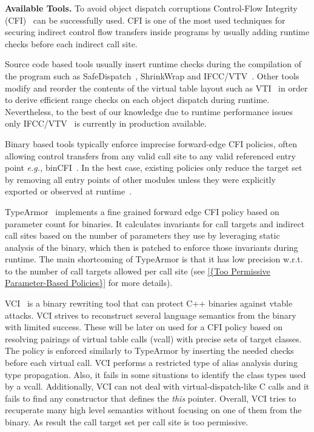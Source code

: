 \textbf{Available Tools.}
To avoid object dispatch corruptions Control-Flow Integrity (CFI)~\cite{abadi:cfi2, abadi:cfi} can be successfully used.
CFI is one of the most used techniques for securing indirect control flow transfers inside programs
by usually adding runtime checks before each indirect call site.

Source code based tools usually insert runtime checks during the compilation of 
the program such as SafeDispatch~\cite{safedispatch:jang}, ShrinkWrap \cite{haller:shrinkwrap} and IFCC/VTV~\cite{vtv:tice}.
Other tools modify and reorder the contents of the virtual table layout such as VTI~\cite{bounov:interleaving} 
in order to derive efficient range checks on each object dispatch during runtime. Nevertheless, to the best of our knowledge 
due to runtime performance issues only IFCC/VTV~\cite{vtv:tice} is currently in production available.

Binary based tools typically enforce imprecise forward-edge CFI 
policies, often allowing control transfers from any valid call site 
to any valid referenced entry point \textit{e.g.,} binCFI~\cite{ccfir:zhang, zhang:usenix}. 
In the best case, existing policies only reduce the target set by
removing all entry points of other modules unless they were
explicitly exported or observed at runtime~\cite{payer:dimva}. 

TypeArmor~\cite{veen:typearmor} implements a fine grained forward edge CFI 
policy based on parameter count for binaries. It calculates invariants for call targets and indirect call sites based on
the number of parameters they use by leveraging static analysis of the binary, which then is
patched to enforce those invariants during runtime. 
The main shortcoming of TypeArmor is that it has low precision 
w.r.t. to the number of call targets allowed per call site 
(see \cref{{Too Permissive Parameter-Based Policies}} for more details).

VCI~\cite{vci:asiaccs} is a binary rewriting tool that can protect C++ binaries against 
vtable attacks. VCI strives to reconstruct several language semantics from the binary with limited success.
These will be later on used for a CFI policy based on resolving pairings of virtual table calls (vcall)
with precise sets of target classes. The policy is enforced similarly to TypeArmor by inserting the 
needed checks before each virtual call. VCI performs a restricted type of alias analysis during type propagation.
Also, it fails in some situations to identify the class types used by a vcall. Additionally, VCI can not deal with 
virtual-dispatch-like C calls and it fails to find any
constructor that defines the \textit{this} pointer. Overall, VCI tries to recuperate many high level 
semantics without focusing on one of them from the binary. As result the call target set per call site is too 
permissive.

